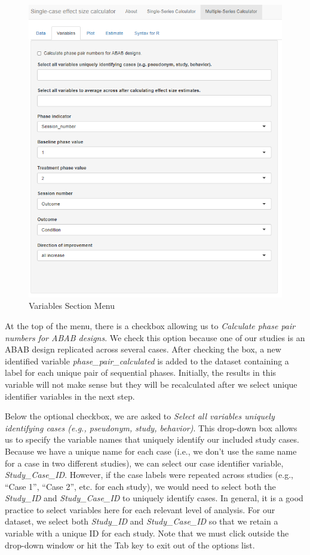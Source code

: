\documentclass[
]{book}
\begin{document}
\begin{figure}
\includegraphics[width=0.75\linewidth]{images/multiseries_variables_empty} \caption{Variables Section Menu}\label{fig:multipleseries-var-empty}
\end{figure}

At the top of the menu, there is a checkbox allowing us to \emph{Calculate phase pair numbers for ABAB designs}. We check this option because one of our studies \citep[i.e.,][]{Byiers2014} is an ABAB design replicated across several cases. After checking the box, a new identified variable \emph{phase\_pair\_calculated} is added to the dataset containing a label for each unique pair of sequential phases. Initially, the results in this variable will not make sense but they will be recalculated after we select unique identifier variables in the next step.

Below the optional checkbox, we are asked to \emph{Select all variables uniquely identifying cases (e.g., pseudonym, study, behavior)}. This drop-down box allows us to specify the variable names that uniquely identify our included study cases. Because we have a unique name for each case (i.e., we don't use the same name for a case in two different studies), we can select our case identifier variable, \emph{Study\_Case\_ID}. However, if the case labels were repeated across studies (e.g., ``Case 1'', ``Case 2'', etc. for each study), we would need to select both the \emph{Study\_ID} and \emph{Study\_Case\_ID} to uniquely identify cases. In general, it is a good practice to select variables here for each relevant level of analysis. For our dataset, we select both \emph{Study\_ID} and \emph{Study\_Case\_ID} so that we retain a variable with a unique ID for each study. Note that we must click outside the drop-down window or hit the Tab key to exit out of the options list.
\end{document}
